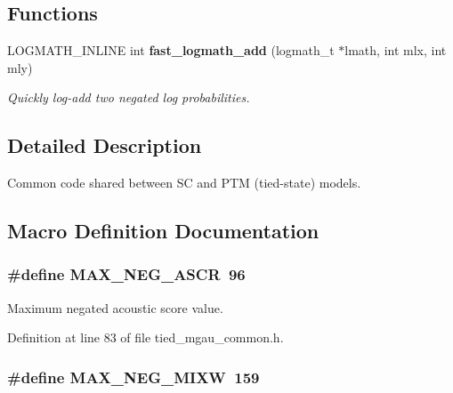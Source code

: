 \subsection*{Functions}
\begin{DoxyCompactItemize}
\item 
L\+O\+G\+M\+A\+T\+H\+\_\+\+I\+N\+L\+I\+N\+E int {\bf fast\+\_\+logmath\+\_\+add} (logmath\+\_\+t $\ast$lmath, int mlx, int mly)
\begin{DoxyCompactList}\small\item\em Quickly log-\/add two negated log probabilities. \end{DoxyCompactList}\end{DoxyCompactItemize}


\subsection{Detailed Description}
Common code shared between S\+C and P\+T\+M (tied-\/state) models. 



\subsection{Macro Definition Documentation}
\subsubsection[{M\+A\+X\+\_\+\+N\+E\+G\+\_\+\+A\+S\+C\+R}]{\setlength{\rightskip}{0pt plus 5cm}\#define M\+A\+X\+\_\+\+N\+E\+G\+\_\+\+A\+S\+C\+R~96}\label{tied__mgau__common_8h_a965d50d73044c3f2dc2589662fd2e89e}


Maximum negated acoustic score value. 



Definition at line 83 of file tied\+\_\+mgau\+\_\+common.\+h.

\subsubsection[{M\+A\+X\+\_\+\+N\+E\+G\+\_\+\+M\+I\+X\+W}]{\setlength{\rightskip}{0pt plus 5cm}\#define M\+A\+X\+\_\+\+N\+E\+G\+\_\+\+M\+I\+X\+W~159}\label{tied__mgau__common_8h_ad739d757ed78293c18dc2386fd3b750e}


